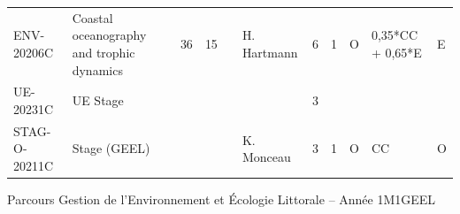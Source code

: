 \documentclass[a4paper,11pt]{article}
\begin{document}
{{\begin{tabular}{lllllllllll}
ENV-20206C    & Coastal oceanography and trophic dynamics                                      & 36 & 15 &    & H. Hartmann     & 6    & 1    & O           & 0,35*CC + 0,65*E & E                \\
\rowcolor[HTML]{C0C0C0} 
UE-20231C     & UE Stage                                                                       &    &    &    &                 & 3    &      &             &                  &                  \\
STAG-O-20211C & Stage (GEEL)                                                                   &    &    &    & K. Monceau      & 3    & 1    & O           & CC               & O                
\end{tabular}}
}{Parcours Gestion de l'Environnement et Écologie Littorale -- Année 1}{M1GEEL}
\end{document}
